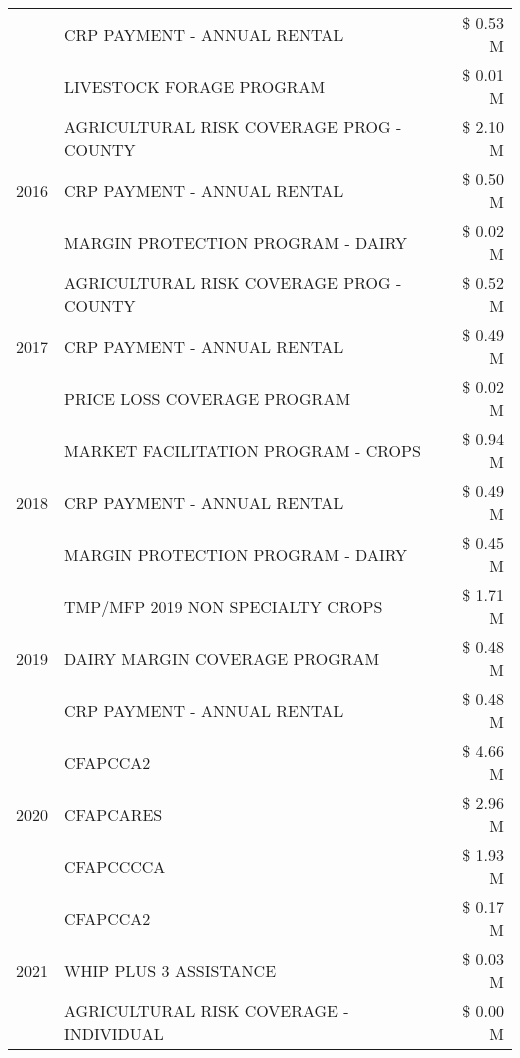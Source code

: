 \begin{tabular}{llr}
 & CRP PAYMENT - ANNUAL RENTAL & \$ 0.53 M \\
 & LIVESTOCK FORAGE PROGRAM & \$ 0.01 M \\
\cline{1-3}
\multirow[t]{3}{*}{2016} & AGRICULTURAL RISK COVERAGE PROG - COUNTY & \$ 2.10 M \\
 & CRP PAYMENT - ANNUAL RENTAL & \$ 0.50 M \\
 & MARGIN PROTECTION PROGRAM - DAIRY & \$ 0.02 M \\
\cline{1-3}
\multirow[t]{3}{*}{2017} & AGRICULTURAL RISK COVERAGE PROG - COUNTY & \$ 0.52 M \\
 & CRP PAYMENT - ANNUAL RENTAL & \$ 0.49 M \\
 & PRICE LOSS COVERAGE PROGRAM & \$ 0.02 M \\
\cline{1-3}
\multirow[t]{3}{*}{2018} & MARKET FACILITATION PROGRAM - CROPS & \$ 0.94 M \\
 & CRP PAYMENT - ANNUAL RENTAL & \$ 0.49 M \\
 & MARGIN PROTECTION PROGRAM - DAIRY & \$ 0.45 M \\
\cline{1-3}
\multirow[t]{3}{*}{2019} & TMP/MFP 2019 NON SPECIALTY CROPS & \$ 1.71 M \\
 & DAIRY MARGIN COVERAGE PROGRAM & \$ 0.48 M \\
 & CRP PAYMENT - ANNUAL RENTAL & \$ 0.48 M \\
\cline{1-3}
\multirow[t]{3}{*}{2020} & CFAPCCA2 & \$ 4.66 M \\
 & CFAPCARES & \$ 2.96 M \\
 & CFAPCCCCA & \$ 1.93 M \\
\cline{1-3}
\multirow[t]{3}{*}{2021} & CFAPCCA2 & \$ 0.17 M \\
 & WHIP PLUS 3 ASSISTANCE & \$ 0.03 M \\
 & AGRICULTURAL RISK COVERAGE - INDIVIDUAL & \$ 0.00 M \\
\cline{1-3}
\bottomrule
\end{tabular}
